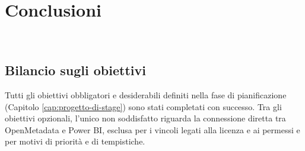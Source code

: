 \chapter{Conclusioni}
\label{cap:conclusioni}

\\

\section{Bilancio sugli obiettivi}
Tutti gli obiettivi obbligatori e desiderabili definiti nella fase di pianificazione (Capitolo \ref{cap:progetto-di-stage}) sono stati completati con successo. 
Tra gli obiettivi opzionali, l'unico non soddisfatto riguarda la connessione diretta tra OpenMetadata e Power BI, esclusa per i vincoli legati alla licenza e ai permessi 
e per motivi di priorità e di tempistiche.

